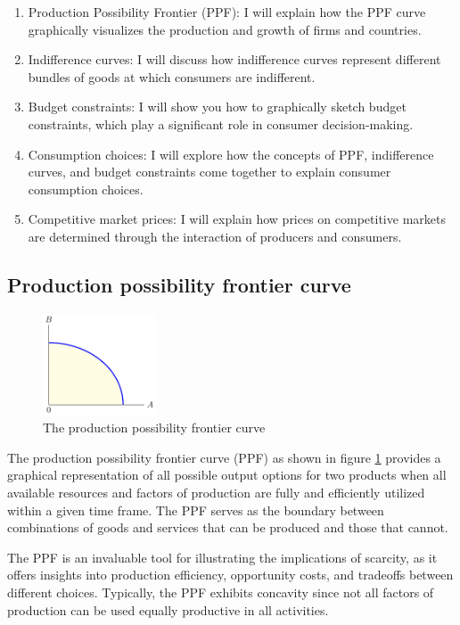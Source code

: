 \documentclass[
  12pt,
  oneside]{book}
\providecommand{\tightlist}{%
  \setlength{\itemsep}{0pt}\setlength{\parskip}{0pt}}
\theoremstyle{definition}
\theoremstyle{definition}
\theoremstyle{definition}
\theoremstyle{definition}
\theoremstyle{remark}
\begin{document}
\begin{enumerate}
\def\labelenumi{\arabic{enumi}.}
\tightlist
\item
  Production Possibility Frontier (PPF): I will explain how the PPF curve graphically visualizes the production and growth of firms and countries.
\item
  Indifference curves: I will discuss how indifference curves represent different bundles of goods at which consumers are indifferent.
\item
  Budget constraints: I will show you how to graphically sketch budget constraints, which play a significant role in consumer decision-making.
\item
  Consumption choices: I will explore how the concepts of PPF, indifference curves, and budget constraints come together to explain consumer consumption choices.
\item
  Competitive market prices: I will explain how prices on competitive markets are determined through the interaction of producers and consumers.
\end{enumerate}

\subsection{Production possibility frontier curve}\label{production-possibility-frontier-curve}

\begin{figure}
\centering
\includegraphics[width=0.3\textwidth,height=\textheight]{fig/ppf1.png}
\caption{\label{fig:ppf} The production possibility frontier curve}
\end{figure}

The production possibility frontier curve (PPF) as shown in figure \ref{fig:ppf} provides a graphical representation of all possible output options for two products when all available resources and factors of production are fully and efficiently utilized within a given time frame. The PPF serves as the boundary between combinations of goods and services that can be produced and those that cannot.

The PPF is an invaluable tool for illustrating the implications of scarcity, as it offers insights into production efficiency, opportunity costs, and tradeoffs between different choices. Typically, the PPF exhibits concavity since not all factors of production can be used equally productive in all activities.
\end{document}
